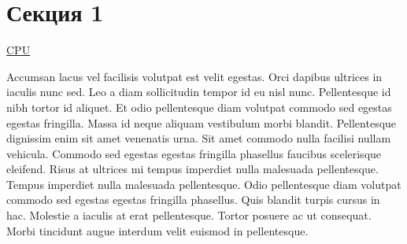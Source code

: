 \section{Секция 1}


\hyperlink{cpu}{CPU}

Accumsan lacus vel facilisis volutpat est velit egestas. Orci dapibus ultrices in iaculis
nunc sed. Leo a diam sollicitudin tempor id eu nisl nunc. Pellentesque id nibh tortor id
aliquet. Et odio pellentesque diam volutpat commodo sed egestas egestas fringilla. Massa
id neque aliquam vestibulum morbi blandit. Pellentesque dignissim enim sit amet venenatis
urna. Sit amet commodo nulla facilisi nullam vehicula. Commodo sed egestas egestas fringilla 
phasellus faucibus scelerisque eleifend. Risus at ultrices mi tempus imperdiet nulla malesuada 
pellentesque. Tempus imperdiet nulla malesuada pellentesque. Odio pellentesque diam volutpat 
commodo sed egestas egestas fringilla phasellus. Quis blandit turpis cursus in hac. Molestie 
a iaculis at erat pellentesque. Tortor posuere ac ut consequat. Morbi tincidunt augue interdum 
velit euismod in pellentesque.

\clearpage

